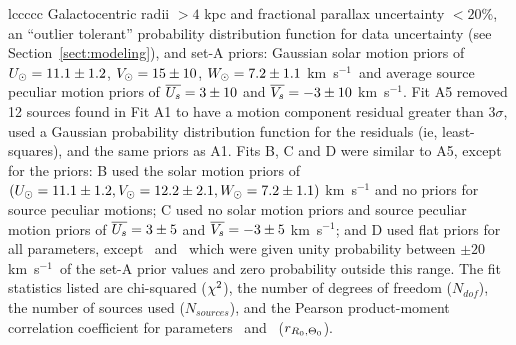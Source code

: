 \documentclass[12pt,preprint]{aastex}
\def\kms  {km~s$^{-1}$}
\def\chisq    {\ifmmode {\chi^2}\else {$\chi^2$}\fi}
\def\Vo    {\ifmmode {V^{Std}_\odot}\else {$V^{Std}_\odot$}\fi}
\def\V     {\ifmmode {V_\odot}\else {$V_\odot$}\fi}
\def\U     {\ifmmode {U_\odot}\else {$U_\odot$}\fi}
\def\W     {\ifmmode {W_\odot}\else {$W_\odot$}\fi}
\def\Vsbar {\ifmmode {\overline{V_s}}\else {$\overline{V_s}$}\fi}
\def\Usbar {\ifmmode {\overline{U_s}}\else {$\overline{U_s}$}\fi}
\def\To    {\ifmmode{\Theta_0}\else{$\Theta_0$}\fi}
\def\Ro    {\ifmmode{R_0}\else{$R_0$}\fi}
\begin{document}
\begin{deluxetable}{lccccc}
{Galactocentric radii $>4$ kpc and fractional parallax uncertainty $<20$\%, 
an ``outlier tolerant'' probability distribution function for data uncertainty 
(see Section~\ref{sect:modeling}),
and set-A priors: Gaussian solar motion priors of $\U=11.1\pm1.2$, $\V=15\pm10$, 
$\W=7.2\pm1.1$ \kms\ and average source peculiar motion priors of 
$\Usbar=3\pm10$ and $\Vsbar=-3\pm10$ \kms.
Fit A5 removed 12 sources found in Fit A1 to have a
motion component residual greater than $3\sigma$, used a Gaussian
probability distribution function for the residuals (ie, least-squares), 
and the same priors as A1.
Fits B, C and D were similar to A5, except for the priors: B used
the solar motion priors of \citet{Schoenrich:10}
$(\U=11.1\pm1.2, \V=12.2\pm2.1, \W=7.2\pm1.1)$ \kms  
and no priors for source peculiar motions; C used
no solar motion priors and source peculiar motion priors
of $\Usbar=3\pm5$ and $\Vsbar=-3\pm5$ \kms; and 
D used flat priors for all parameters, except
\Vo\ and \Vsbar\ which were given unity probability between $\pm20$ \kms\ 
of the set-A prior values and zero probability outside this range.
The fit statistics listed are chi-squared ($\chisq$), the
number of degrees of freedom ($N_{dof}$), the number of sources used ($N_{sources}$),
and the Pearson product-moment correlation coefficient for parameters 
\Ro\ and \To\ ($r_{\Ro,\To}$). 
               }
\label{table:fits}
\end{deluxetable}
\end{document}
